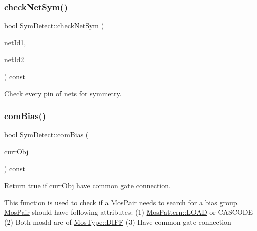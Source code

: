 \subsubsection{\texorpdfstring{check\+Net\+Sym()}{checkNetSym()}}
{\footnotesize\ttfamily bool Sym\+Detect\+::check\+Net\+Sym (\begin{DoxyParamCaption}\item[{\hyperlink{type_8h_a581e8093e28e7362f2b6937296190676}{Index\+Type}}]{net\+Id1,  }\item[{\hyperlink{type_8h_a581e8093e28e7362f2b6937296190676}{Index\+Type}}]{net\+Id2 }\end{DoxyParamCaption}) const\hspace{0.3cm}{\ttfamily [private]}}



Check every pin of nets for symmetry. 

\mbox{\label{classSymDetect_a13ddc56c5e937097178352eb00d71cf3}} 
\subsubsection{\texorpdfstring{com\+Bias()}{comBias()}}
{\footnotesize\ttfamily bool Sym\+Detect\+::com\+Bias (\begin{DoxyParamCaption}\item[{\hyperlink{classMosPair}{Mos\+Pair} \&}]{curr\+Obj }\end{DoxyParamCaption}) const\hspace{0.3cm}{\ttfamily [private]}}



Return true if curr\+Obj have common gate connection. 

This function is used to check if a \hyperlink{classMosPair}{Mos\+Pair} needs to search for a bias group. \hyperlink{classMosPair}{Mos\+Pair} should have following attributes\+: (1) \hyperlink{type_8h_af19eddb079bfea723256710b029c38e8a615d2885ef7576cedd9aafbb2578f028}{Mos\+Pattern\+::\+L\+O\+AD} or C\+A\+S\+C\+O\+DE (2) Both mos\+Id are of \hyperlink{type_8h_a34a6a66323cfecf83dfe00bc8fd96333aa2e1ec2dd3d8195d238c5494f0ac5578}{Mos\+Type\+::\+D\+I\+FF} (3) Have common gate connection \mbox{\label{classSymDetect_acd33a2c834493240fc4e8840819d676c}} 

